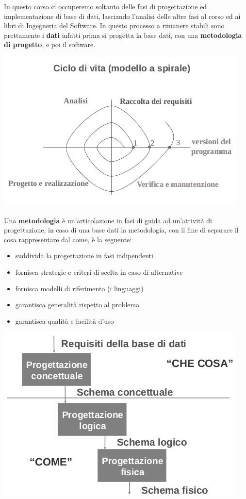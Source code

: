 \documentclass[a4paper,12pt, oneside]{book}
\begin{document}
In questo corso ci occuperemo soltanto delle fasi di progettazione ed implementazione di base di dati, 
lasciando l'analisi delle altre fasi al corso ed ai libri di Ingegneria del Software.\newline
In questo processo a rimanere stabili sono prettamente i \textbf{dati} infatti prima si progetta la base dati,
con una \textbf{metodologia di progetto}, e poi il software.
\begin{center}
\includegraphics[scale=2.8]{img/bas2.png}
\end{center}
Una \textbf{metodologia} è un'articolazione in fasi di guida ad un'attività di progettazione, in caso
di una base dati la metodologia, con il fine di separare il cosa rappresentare dal come, è la seguente:
\begin{itemize}
    \item suddivida la progettazione in fasi indipendenti
    \item fornisca strategie e criteri di scelta in caso di alternative
    \item fornisca modelli di riferimento (i linguaggi)
    \item garantisca generalità rispetto al problema
    \item garantisca qualità e facilità d'uso
\end{itemize}
\begin{center}
\includegraphics[scale=2.5]{img/bas3.png}
\end{center}
\end{document}
